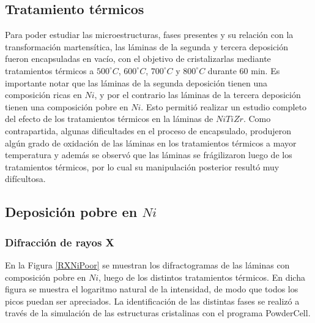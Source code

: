 \documentclass[12pt]{article}
\theoremstyle{definition}
\theoremstyle{remark}
\begin{document}
{\subsection{Tratamiento térmicos}

Para poder estudiar las microestructuras, fases presentes y su relación con la transformación martensítica, las láminas de la segunda y tercera deposición fueron encapsuladas en vacío, con el objetivo de cristalizarlas mediante tratamientos térmicos a $500 ^\circ C$, $600 ^\circ C$, $700 ^\circ C$ y $800 ^\circ C$ durante $60$ min. Es importante notar que las láminas de la segunda deposición tienen una composición ricas en $Ni$, y por el contrario las láminas de la tercera deposición tienen una composición pobre en $Ni$. Esto permitió realizar un estudio completo del efecto de los tratamientos térmicos en la láminas de $NiTiZr$. Como contrapartida, algunas dificultades en el proceso de encapsulado, produjeron algún grado de oxidación de las láminas en los tratamientos térmicos a mayor temperatura y además se observó que las láminas se frágilizaron luego de los tratamientos térmicos, por lo cual su manipulación posterior resultó muy difícultosa.

\subsection{Deposición pobre en $Ni$}
\subsubsection{Difracción de rayos X}
En la Figura \ref{RXNiPoor} se muestran los difractogramas de las láminas con composición pobre en $Ni$, luego de los distintos tratamientos térmicos. En dicha figura se muestra el logaritmo natural de la intensidad, de modo que todos los picos puedan ser apreciados. La identificación de las distintas fases se realizó a través de la simulación de las estructuras cristalinas con el programa PowderCell.

}
\end{document}

